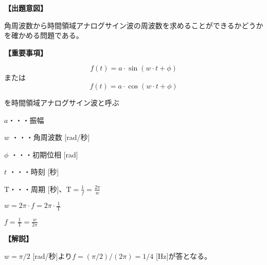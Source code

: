 \noindent \textbf{【出題意図】}

\noindent 角周波数から時間領域アナログサイン波の周波数を求めることができるかどうかを確かめる問題である。

\vspace{1em}
\noindent \textbf{【重要事項】}

\[
f(t) = a \cdot \sin( w \cdot t + \phi )
\]
%
\noindent または
%
\[
f(t) = a \cdot \cos( w \cdot t + \phi )
\]

\medskip
\noindent を時間領域アナログサイン波と呼ぶ

\bigskip
\noindent $a$・・・振幅

\bigskip
\noindent $w$ ・・・角周波数 [rad/秒]

\bigskip
\noindent $\phi$ ・・・初期位相 [rad]

\bigskip
\noindent $t$ ・・・時刻 [秒]

\bigskip
$\textrm{T}$・・・周期 [秒]、$\textrm{T} = \frac{1}{f} = \frac{2\pi}{w}$

\bigskip
$w = 2\pi \cdot f = 2 \pi \cdot \frac{1}{\textrm{T}}$

\bigskip
$f = \frac{1}{\textrm{T}} = \frac{w}{2\pi}$

\vspace{1em}
\noindent \textbf{【解説】}

\noindent $w = \pi/2$ [rad/秒]より$f = (\pi/2) / (2\pi) = 1/4$ [Hz]が答となる。
